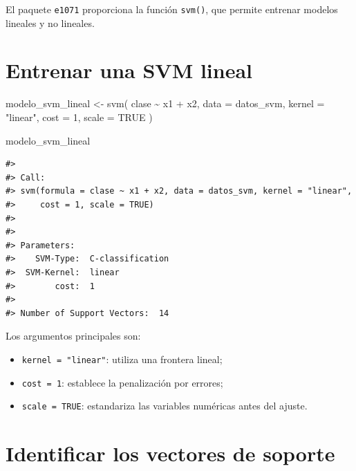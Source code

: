 \documentclass[
  spanish,
  10.5pt,
  letterpaper,
  openany,
  headings=big]{scrbook}
\newenvironment{Shaded}{}{}
\newcommand{\AttributeTok}[1]{\textcolor[rgb]{0.84,0.23,0.29}{#1}}
\newcommand{\ConstantTok}[1]{\textcolor[rgb]{0.00,0.36,0.77}{#1}}
\newcommand{\DecValTok}[1]{\textcolor[rgb]{0.00,0.36,0.77}{#1}}
\newcommand{\FunctionTok}[1]{\textcolor[rgb]{0.44,0.26,0.76}{#1}}
\newcommand{\NormalTok}[1]{\textcolor[rgb]{0.14,0.16,0.18}{#1}}
\newcommand{\OtherTok}[1]{\textcolor[rgb]{0.44,0.26,0.76}{#1}}
\newcommand{\SpecialCharTok}[1]{\textcolor[rgb]{0.00,0.36,0.77}{#1}}
\newcommand{\StringTok}[1]{\textcolor[rgb]{0.01,0.18,0.38}{#1}}
\providecommand{\tightlist}{%
  \setlength{\itemsep}{0pt}\setlength{\parskip}{0pt}}
\begin{document}
El paquete \texttt{e1071} proporciona la función \texttt{svm()}, que
permite entrenar modelos lineales y no lineales.

\section{Entrenar una SVM lineal}\label{entrenar-una-svm-lineal}

\begin{Shaded}
\begin{Highlighting}[]
\NormalTok{modelo\_svm\_lineal }\OtherTok{\textless{}{-}} \FunctionTok{svm}\NormalTok{(}
\NormalTok{  clase }\SpecialCharTok{\textasciitilde{}}\NormalTok{ x1 }\SpecialCharTok{+}\NormalTok{ x2,}
  \AttributeTok{data =}\NormalTok{ datos\_svm,}
  \AttributeTok{kernel =} \StringTok{"linear"}\NormalTok{,}
  \AttributeTok{cost =} \DecValTok{1}\NormalTok{,}
  \AttributeTok{scale =} \ConstantTok{TRUE}
\NormalTok{)}

\NormalTok{modelo\_svm\_lineal}
\end{Highlighting}
\end{Shaded}

\begin{verbatim}
#> 
#> Call:
#> svm(formula = clase ~ x1 + x2, data = datos_svm, kernel = "linear", 
#>     cost = 1, scale = TRUE)
#> 
#> 
#> Parameters:
#>    SVM-Type:  C-classification 
#>  SVM-Kernel:  linear 
#>        cost:  1 
#> 
#> Number of Support Vectors:  14
\end{verbatim}

Los argumentos principales son:

\begin{itemize}
\tightlist
\item
  \texttt{kernel\ =\ "linear"}: utiliza una frontera lineal;
\item
  \texttt{cost\ =\ 1}: establece la penalización por errores;
\item
  \texttt{scale\ =\ TRUE}: estandariza las variables numéricas antes del
  ajuste.
\end{itemize}

\section{Identificar los vectores de
soporte}\label{identificar-los-vectores-de-soporte}

\begin{Shaded}
\end{Shaded}
\end{document}
